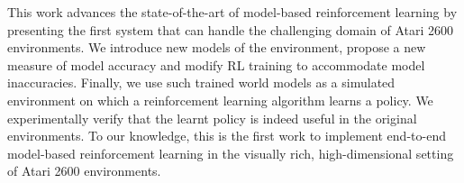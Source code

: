 This work advances the state-of-the-art of model-based reinforcement learning by presenting the first system that can handle the challenging domain of Atari 2600 environments. We introduce new models of the environment, propose a new measure of model accuracy and modify RL training to accommodate model inaccuracies. Finally, we use such trained world models as a simulated environment on which a reinforcement learning algorithm learns a policy. We experimentally verify that the learnt policy is indeed useful in the original environments. To our knowledge, this is the first work to implement end-to-end model-based reinforcement learning in the visually rich, high-dimensional setting of Atari 2600 environments.

